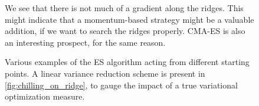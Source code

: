 \begin{figure}[ht]
    \hfill
    \caption{We see that there is not much of a gradient along the ridges. This might indicate that a momentum-based strategy might be a valuable addition, if we want to search the ridges properly. CMA-ES is also an interesting prospect, for the same reason.}
\end{figure}
\begin{figure}[ht]
    \hfill
    \caption{Various examples of the ES algorithm acting from different starting points. A linear variance reduction scheme is present in \cref{fig:chilling_on_ridge}, to gauge the impact of a true variational optimization measure.}
    \label{fig:ES-examples} 
\end{figure} 

